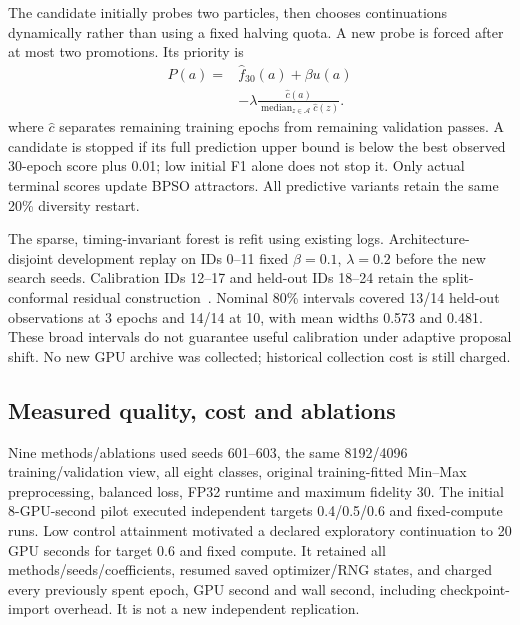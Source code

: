 The candidate initially probes two particles, then chooses continuations dynamically rather than using a fixed halving quota. A new probe is forced after at most two promotions. Its priority is
\begin{equation}
\begin{split}
P(a)={}&\widehat f_{30}(a)+\beta u(a)\\
&-\lambda\frac{\widehat c(a)}{\operatorname{median}_{z\in\mathcal A}\widehat c(z)}.
\end{split}
\end{equation}
where $\widehat c$ separates remaining training epochs from remaining validation passes. A candidate is stopped if its full prediction upper bound is below the best observed 30-epoch score plus 0.01; low initial F1 alone does not stop it. Only actual terminal scores update BPSO attractors. All predictive variants retain the same 20\% diversity restart.

The sparse, timing-invariant forest is refit using existing logs. Architecture-disjoint development replay on IDs 0--11 fixed $\beta=0.1$, $\lambda=0.2$ before the new search seeds. Calibration IDs 12--17 and held-out IDs 18--24 retain the split-conformal residual construction~\cite{angelopoulos2021}. Nominal 80\% intervals covered 13/14 held-out observations at 3 epochs and 14/14 at 10, with mean widths 0.573 and 0.481. These broad intervals do not guarantee useful calibration under adaptive proposal shift. No new GPU archive was collected; historical collection cost is still charged.

\subsection{Measured quality, cost and ablations}
Nine methods/ablations used seeds 601--603, the same 8192/4096 training/validation view, all eight classes, original training-fitted Min--Max preprocessing, balanced loss, FP32 runtime and maximum fidelity 30. The initial 8-GPU-second pilot executed independent targets 0.4/0.5/0.6 and fixed-compute runs. Low control attainment motivated a declared exploratory continuation to 20 GPU seconds for target 0.6 and fixed compute. It retained all methods/seeds/coefficients, resumed saved optimizer/RNG states, and charged every previously spent epoch, GPU second and wall second, including checkpoint-import overhead. It is not a new independent replication.

